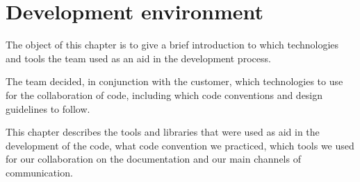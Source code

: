 \chapter{Development environment}

The object of this chapter is to give a brief introduction to which technologies and tools the team used as an aid in the development process.

The team decided, in conjunction with the customer, which technologies to use for the collaboration of code, including which code conventions and design guidelines to follow. 

This chapter describes the tools and libraries that were used as aid in the development of the code, what code convention we practiced, which tools we used for our collaboration on the documentation and our main channels of communication.


\newpage






